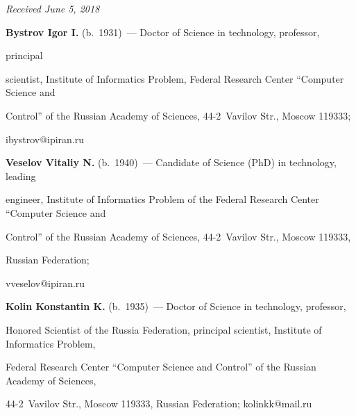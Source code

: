 \vspace*{-3pt}





\hfill{\small\textit{Received June 5, 2018}}  


  


  \Contr


  


  


  \noindent


  \textbf{Bystrov Igor I.} (b.\ 1931)~--- Doctor of Science in technology, professor, 


  principal 


scientist, Institute of Informatics Problem, Federal Research Center ``Computer Science and 


Control'' of the Russian Academy of Sciences, 44-2~Vavilov Str., Moscow 119333; 


\mbox{ibystrov@ipiran.ru}


  


  \vspace*{5pt}


  


  \noindent


  \textbf{Veselov Vitaliy N.} (b.\ 1940)~--- Candidate of Science (PhD) in technology, leading 


engineer, Institute of Informatics Problem of the Federal Research Center ``Computer Science and 


Control'' of the Russian Academy of Sciences, 44-2~Vavilov Str., Moscow 119333,


Russian Federation; 


\mbox{vveselov@ipiran.ru}


  


  \vspace*{5pt}





  \noindent


  \textbf{Kolin Konstantin K.} (b.\ 1935)~--- Doctor of Science in technology, professor, 


Honored Scientist of the Russia Federation, principal scientist, Institute of Informatics Problem, 


Federal Research Center ``Computer Science and Control'' of the Russian Academy of Sciences, 


44-2~Vavilov Str., Moscow 119333, Russian Federation; \mbox{kolinkk@mail.ru}











\label{end\stat}








\renewcommand{\bibname}{\protect\rm Литература}


